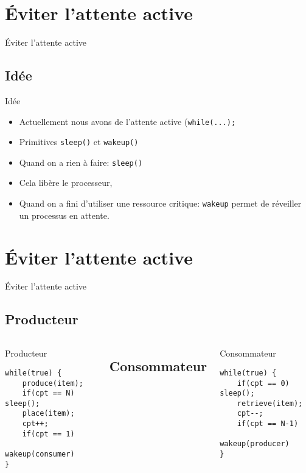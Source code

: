 \def\sectitle{Éviter l'attente active}
\section{\sectitle}
\begin{frame}{\sectitle}
\def\subsectitle{Idée}
\subsection{\subsectitle}
\begin{block}{\subsectitle}
\begin{itemize}
    \item Actuellement nous avons de l'attente active (\texttt{while(...);}
    \item Primitives \texttt{sleep()} et \texttt{wakeup()}
    \item Quand on a rien à faire: \texttt{sleep()}
    \item Cela libère le processeur,
    \item Quand on a fini d'utiliser une ressource critique: \texttt{wakeup} 
    permet de réveiller un processus en attente.
\end{itemize}
\end{block}
\end{frame}

\def\sectitle{Éviter l'attente active}
\section{\sectitle}
\begin{frame}[containsverbatim]{\sectitle}
\def\subsectitle{Producteur}
\subsection{\subsectitle}
\begin{columns}[t]
\begin{exampleblock}{\subsectitle}
\begin{verbatim}
while(true) {
    produce(item);
    if(cpt == N) sleep();
    place(item);
    cpt++;
    if(cpt == 1) 
        wakeup(consumer)
}
\end{verbatim}
\end{exampleblock}
\def\subsectitle{Consommateur}
\subsection{\subsectitle}
\begin{exampleblock}{\subsectitle}
\begin{verbatim}
while(true) {
    if(cpt == 0) sleep();
    retrieve(item);
    cpt--;
    if(cpt == N-1) 
        wakeup(producer)
}
\end{verbatim}
\end{exampleblock}
\end{columns}

\end{frame}

